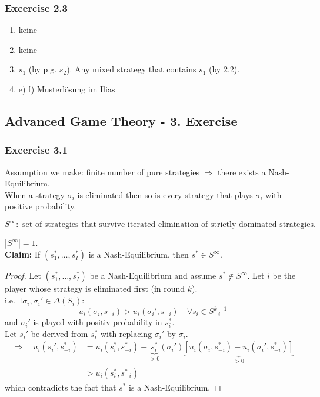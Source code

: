 \documentclass[12pt]{extreport} %
\theoremstyle{named}
\theoremstyle{itshape}
\theoremstyle{normal}
\begin{document}
\subsubsection*{Excercise 2.3}

\begin{enumerate}
	\item keine
	\item keine
	\item $s_1$ (by p.g. $s_2$). Any mixed strategy that contains $s_1$ (by 2.2).
	\item e) f) Musterlösung im Ilias
\end{enumerate}


\subsection*{Advanced Game Theory - 3. Exercise}


\subsubsection*{Excercise 3.1}
  Assumption we make: finite number of pure strategies $\Rightarrow$ there exists a Nash-Equilibrium. ~\\
  
  When a strategy $\sigma_{i}$ is eliminated then so is every strategy that plays $\sigma_{i}$ with positive probability.
  
  $$ S^{\infty}: \text{ set of strategies that survive iterated elimination of strictly dominated strategies.} $$
  
  $\left| S^{\infty} \right| = 1$. ~\\
  
  \textbf{Claim:} If $\left(s_{1}^{*}, \dotsc, s_{I}^{*} \right)$ is a Nash-Equilibrium, then $s^{*} \in S^{\infty}$.
  \begin{proof}
  	Let $\left( s_{1}^{*}, \dotsc, s_{I}^{*} \right)$ be a Nash-Equilibrium and assume $s^{*} \notin S^{\infty}$. Let $i$ be the player whose strategy is eliminated first (in round $k$). ~\\
  	
  	i.e. $\exists \sigma_{i}, \sigma_{i}' \in \Delta\left(S_{i}\right)$:
  	$$ u_{i}(\sigma_{i}, s_{-i}) > u_{i}(\sigma_{i}', s_{-i}) \quad \forall s_{i} \in S_{-i}^{k-1} $$
  	and $\sigma_{i}'$ is played with positiv probability in $s_{i}^{*}$. ~\\
  	
  	Let $s_{i}'$ be derived from $s_{i}^{*}$ with replacing $\sigma_{i}'$ by $\sigma_{i}$.
  	\begin{align*}
  		\Rightarrow \quad u_{i}(s_{i}', s_{-i}^{*}) &= u_{i}(s_{i}^{*},  s_{-i}^{*}) + \underbrace{s_{i}^{*}}_{> 0}(\sigma_{i}')\underbrace{\left[ u_{i}(\sigma_{i}, s_{-i}^{*}) - u_{i}(\sigma_{i}', s_{-i}^{*}) \right]}_{> 0} \\
  		& > u_{i}(s_{i}^{*}, s_{-i}^{*})
  	\end{align*} 
  which contradicts the fact that $s^{*}$ is a Nash-Equilibrium.
  \end{proof}
  
\end{document}
